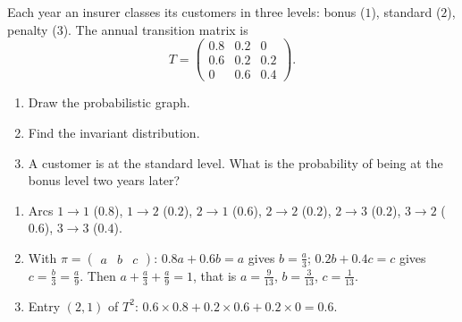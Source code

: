 \begin{exercise}
Each year an insurer classes its customers in three levels: bonus ($1$), standard ($2$), penalty ($3$). The annual transition matrix is
\[T=\begin{pmatrix}\num{0,8}&\num{0,2}&0\\\num{0,6}&\num{0,2}&\num{0,2}\\0&\num{0,6}&\num{0,4}\end{pmatrix}.\]
\begin{enumerate}
\item Draw the probabilistic graph.
\item Find the invariant distribution.
\item A customer is at the standard level. What is the probability of being at the bonus level two years later?
\end{enumerate}
\end{exercise}
\begin{solution}
\begin{enumerate}
\item Arcs $1\to1$ ($\num{0,8}$), $1\to2$ ($\num{0,2}$), $2\to1$ ($\num{0,6}$), $2\to2$ ($\num{0,2}$), $2\to3$ ($\num{0,2}$), $3\to2$ ($\num{0,6}$), $3\to3$ ($\num{0,4}$).
\item With $\pi=\begin{pmatrix}a&b&c\end{pmatrix}$: $\num{0,8}a+\num{0,6}b=a$ gives $b=\frac a3$; $\num{0,2}b+\num{0,4}c=c$ gives $c=\frac b3=\frac a9$. Then $a+\frac a3+\frac a9=1$, that is $a=\frac9{13}$, $b=\frac3{13}$, $c=\frac1{13}$.
\item Entry $(2,1)$ of $T^2$: $\num{0,6}\times\num{0,8}+\num{0,2}\times\num{0,6}+\num{0,2}\times0=\num{0,6}$.
\end{enumerate}
\end{solution}

